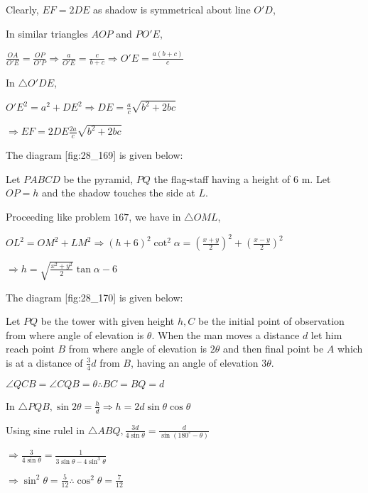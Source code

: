   Clearly, $EF = 2DE$ as shadow is symmetrical about line $O'D$,

  In similar triangles $AOP$ and $PO'E$,

  $\frac{OA}{O'E} = \frac{OP}{O'P} \Rightarrow \frac{a}{O'E} = \frac{c}{b + c} \Rightarrow O'E =
  \frac{a(b + c)}{c}$

  In $\triangle O'DE$,

  $O'E^2 = a^2 + DE^2 \Rightarrow DE = \frac{a}{c}\sqrt{b^2 + 2bc}$

  $\Rightarrow EF = 2DE \frac{2a}{c}\sqrt{b^2 + 2bc}$

\item The diagram [fig:28_169] is given below:

  \startplacefigure[reference=fig:28_169]
    \externalfigure[28_169.pdf]
  \stopplacefigure

  Let $PABCD$ be the pyramid, $PQ$ the flag-staff having a height of $6$ m. Let
  $OP = h$ and the shadow touches the side at $L$.

  Proceeding like problem $167$, we have in $\triangle OML$,

  $OL^2 = OM^2 + LM^2 \Rightarrow (h + 6)^2\cot^2\alpha = \left(\frac{x + y}{2}\right)^2 +
  \left(\frac{x - y}{2}\right)^2$

  $\Rightarrow h = \sqrt{\frac{x^2 + y^2}{2}}\tan\alpha - 6$

\item The diagram [fig:28_170] is given below:

  \startplacefigure[reference=fig:28_170]
    \externalfigure[28_170.pdf]
  \stopplacefigure

  Let $PQ$ be the tower with given height $h, C$ be the initial point of observation from
  where angle of elevation is $\theta$. When the man moves a distance $d$ let him reach point
  $B$ from where angle of elevation is $2\theta$ and then final point be $A$ which is
  at a distance of $\frac{3}{4}d$ from $B$, having an angle of elevation $3\theta$.

  $\angle QCB = \angle CQB = \theta \therefore BC = BQ = d$

  In $\triangle PQB, \sin2\theta = \frac{h}{d} \Rightarrow h = 2d\sin\theta\cos\theta$

  Using sine rulel in $\triangle ABQ, \frac{3d}{4\sin\theta} = \frac{d}{\sin(180^\circ - \theta)}$

  $\Rightarrow \frac{3}{4\sin\theta} = \frac{1}{3\sin\theta - 4\sin^3\theta}$

  $\Rightarrow \sin^2\theta = \frac{5}{12} \therefore \cos^2\theta = \frac{7}{12}$

